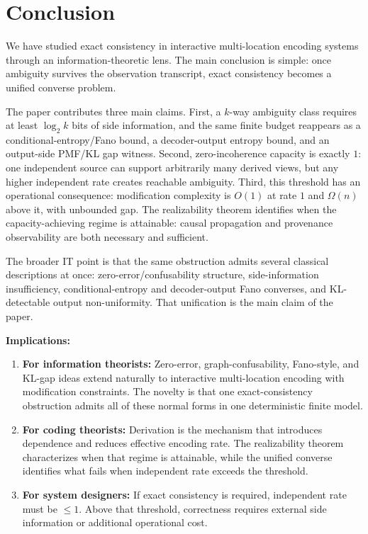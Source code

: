 \section{Conclusion}\label{sec:conclusion}

We have studied exact consistency in interactive multi-location encoding systems through an information-theoretic lens. The main conclusion is simple: once ambiguity survives the observation transcript, exact consistency becomes a unified converse problem.

The paper contributes three main claims. First, a $k$-way ambiguity class requires at least $\log_2 k$ bits of side information, and the same finite budget reappears as a conditional-entropy/Fano bound, a decoder-output entropy bound, and an output-side PMF/KL gap witness. Second, zero-incoherence capacity is exactly $1$: one independent source can support arbitrarily many derived views, but any higher independent rate creates reachable ambiguity. Third, this threshold has an operational consequence: modification complexity is $O(1)$ at rate $1$ and $\Omega(n)$ above it, with unbounded gap. The realizability theorem identifies when the capacity-achieving regime is attainable: causal propagation and provenance observability are both necessary and sufficient.

The broader IT point is that the same obstruction admits several classical descriptions at once: zero-error/confusability structure, side-information insufficiency, conditional-entropy and decoder-output Fano converses, and KL-detectable output non-uniformity. That unification is the main claim of the paper.

\textbf{Implications:}

\begin{enumerate}
\item \textbf{For information theorists:} Zero-error, graph-confusability, Fano-style, and KL-gap ideas extend naturally to interactive multi-location encoding with modification constraints. The novelty is that one exact-consistency obstruction admits all of these normal forms in one deterministic finite model.

\item \textbf{For coding theorists:} Derivation is the mechanism that introduces dependence and reduces effective encoding rate. The realizability theorem characterizes when that regime is attainable, while the unified converse identifies what fails when independent rate exceeds the threshold.

\item \textbf{For system designers:} If exact consistency is required, independent rate must be $\leq 1$. Above that threshold, correctness requires external side information or additional operational cost.
\end{enumerate}

